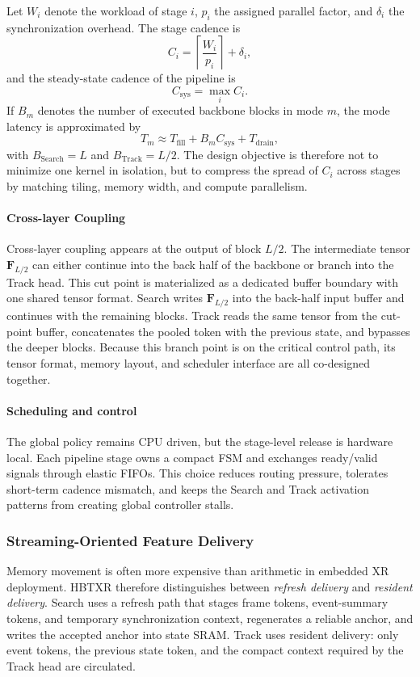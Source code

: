 \documentclass[journal]{IEEEtran}
\begin{document}
Let $W_i$ denote the workload of stage $i$, $p_i$ the assigned parallel factor, and $\delta_i$ the synchronization overhead. The stage cadence is
\begin{equation}
C_i=\left\lceil\frac{W_i}{p_i}\right\rceil+\delta_i,
\end{equation}
and the steady-state cadence of the pipeline is
\begin{equation}
C_{\mathrm{sys}}=\max_i C_i.
\end{equation}
If $B_m$ denotes the number of executed backbone blocks in mode $m$, the mode latency is approximated by
\begin{equation}
T_m \approx T_{\mathrm{fill}} + B_mC_{\mathrm{sys}} + T_{\mathrm{drain}},
\end{equation}
with $B_{\mathrm{Search}}=L$ and $B_{\mathrm{Track}}=L/2$. The design objective is therefore not to minimize one kernel in isolation, but to compress the spread of $C_i$ across stages by matching tiling, memory width, and compute parallelism.

\paragraph*{Cross-layer Coupling}
Cross-layer coupling appears at the output of block $L/2$. The intermediate tensor $\mathbf F_{L/2}$ can either continue into the back half of the backbone or branch into the Track head. This cut point is materialized as a dedicated buffer boundary with one shared tensor format. Search writes $\mathbf F_{L/2}$ into the back-half input buffer and continues with the remaining blocks. Track reads the same tensor from the cut-point buffer, concatenates the pooled token with the previous state, and bypasses the deeper blocks. Because this branch point is on the critical control path, its tensor format, memory layout, and scheduler interface are all co-designed together.

\paragraph*{Scheduling and control}
The global policy remains CPU driven, but the stage-level release is hardware local. Each pipeline stage owns a compact FSM and exchanges ready/valid signals through elastic FIFOs. This choice reduces routing pressure, tolerates short-term cadence mismatch, and keeps the Search and Track activation patterns from creating global controller stalls.

\subsubsection{Streaming-Oriented Feature Delivery}
Memory movement is often more expensive than arithmetic in embedded XR deployment. HBTXR therefore distinguishes between \emph{refresh delivery} and \emph{resident delivery}. Search uses a refresh path that stages frame tokens, event-summary tokens, and temporary synchronization context, regenerates a reliable anchor, and writes the accepted anchor into state SRAM. Track uses resident delivery: only event tokens, the previous state token, and the compact context required by the Track head are circulated.
\end{document}
